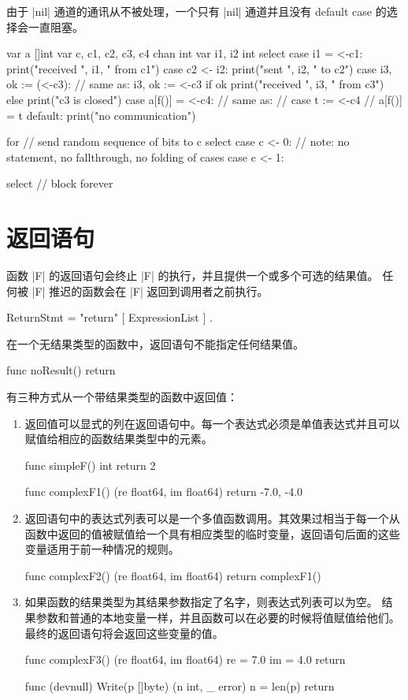由于 \code|nil| 通道的通讯从不被处理，一个只有 \code|nil| 通道并且没有 default  case 的选择会一直阻塞。
\begin{golang}
var a []int
var c, c1, c2, c3, c4 chan int
var i1, i2 int
select {
case i1 = <-c1:
	print("received ", i1, " from c1\n")
case c2 <- i2:
	print("sent ", i2, " to c2\n")
case i3, ok := (<-c3):  // same as: i3, ok := <-c3
	if ok {
		print("received ", i3, " from c3\n")
	} else {
		print("c3 is closed\n")
	}
case a[f()] = <-c4:
	// same as:
	// case t := <-c4
	//	a[f()] = t
default:
	print("no communication\n")
}

for {  // send random sequence of bits to c
	select {
	case c <- 0:  // note: no statement, no fallthrough, no folding of cases
	case c <- 1:
	}
}

select {}  // block forever
\end{golang}


\section{返回语句}
函数 \code|F| 的返回语句会终止 \code|F| 的执行，并且提供一个或多个可选的结果值。
任何被 \code|F|  推迟的函数会在 \code|F| 返回到调用者之前执行。
\begin{EBNF}
ReturnStmt = "return" [ ExpressionList ] .
\end{EBNF}

在一个无结果类型的函数中，返回语句不能指定任何结果值。
\begin{golang}
func noResult() {
	return
}
\end{golang}

有三种方式从一个带结果类型的函数中返回值：
\begin{enumerate}
\item 
返回值可以显式的列在返回语句中。每一个表达式必须是单值表达式并且可以赋值给相应的函数结果类型中的元素。
\begin{golang}
func simpleF() int {
	return 2
}

func complexF1() (re float64, im float64) {
	return -7.0, -4.0
}
\end{golang}
\item 
返回语句中的表达式列表可以是一个多值函数调用。其效果过相当于每一个从函数中返回的值被赋值给一个具有相应类型的临时变量，返回语句后面的这些变量适用于前一种情况的规则。
\begin{golang}
func complexF2() (re float64, im float64) {
	return complexF1()
}
\end{golang}
\item 
如果函数的结果类型为其结果参数指定了名字，则表达式列表可以为空。
结果参数和普通的本地变量一样，并且函数可以在必要的时候将值赋值给他们。
最终的返回语句将会返回这些变量的值。
\begin{golang}
func complexF3() (re float64, im float64) {
	re = 7.0
	im = 4.0
	return
}

func (devnull) Write(p []byte) (n int, _ error) {
	n = len(p)
	return
}
\end{golang}
\end{enumerate}

